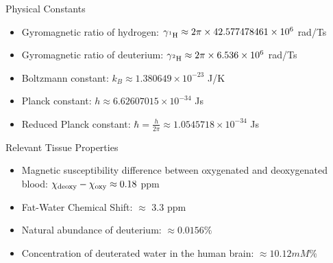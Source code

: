 
\glsaddall
{
	\setlength{\glsdescwidth}{0.82\linewidth}
\printglossary[type=main,style=mystyle,nonumberlist,title=Acronyms \& Definitions]
}

\Large{Physical Constants}
\normalsize
\begin{itemize}
	\item Gyromagnetic ratio of hydrogen: $\gamma\textsubscript{$^1$H} \approx 2\pi\times 42.577478461 \times10^{6}$ rad/Ts
	\item Gyromagnetic ratio of deuterium: $\gamma\textsubscript{$^2$H} \approx 2\pi \times 6.536 \times10^{6}$ rad/Ts
	\item Boltzmann constant: $k_B \approx 1.380649 \times 10^{-23}$ J/K
	\item Planck constant: $h \approx 6.62607015 \times 10^{-34}$ Js
	\item Reduced Planck constant: $\hbar = \frac{h}{2\pi} \approx 1.0545718 \times 10^{-34}$ Js
\end{itemize}

\Large{Relevant Tissue Properties}
\normalsize
\begin{itemize}

	\item Magnetic susceptibility difference between oxygenated and deoxygenated blood: $\chi\textsubscript{deoxy}-\chi\textsubscript{oxy} \approx 0.18$ ppm~\cite{weisskoffMRISusceptometryImagebased1992}
	\item Fat-Water Chemical Shift: $\approx$ 3.3 ppm ~\cite{renCompositionAdiposeTissue2008}
		\item Natural abundance of deuterium: $\approx 0.0156\%$
	\item Concentration of deuterated water in the human brain: $\approx 10.12 mM\%$~\cite{defeyterDeuteriumMetabolicImaging2018}
\end{itemize}


